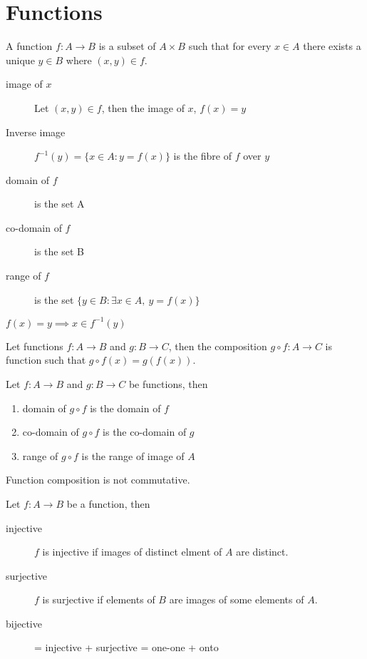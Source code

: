 \section{Functions}
	\begin{definition}
		A function $ f : A \to B$ is a subset of $A \times B$ such that for every $x \in A$ there exists a unique $y \in B$ where $(x,y) \in f$.
	\end{definition}
	\begin{description}
		\item[image of $x$] Let $(x,y) \in f$, then the image of $x$, $ f(x) = y$
		\item[Inverse image] $f^{-1}(y) = \{ x \in A : y = f(x) \}$ is the fibre of $f$ over $y$\cite{gallian}
		\item[domain of $f$] is the set A 
		\item[co-domain of $f$] is the set B
		\item[range of $f$] is the set $\{ y\in B : \exists x \in A,\ y = f(x) \}$
	\end{description}
	\begin{remark}
		$f(x) = y \implies x \in f^{-1}(y)$
	\end{remark}
	\begin{definition}
		Let functions $f : A \to B$ and $g : B \to C$, then the composition $g \circ f : A \to C$ is function such that $g \circ f (x) = g(f(x))$.
	\end{definition}
	\begin{theorem} Let $f : A \to B$ and $g : B \to C$ be functions, then
		\begin{enumerate}
			\item domain of $g \circ f$ is the domain of $f$
			\item co-domain of $g \circ f$ is the co-domain of $g$
			\item range of $g \circ f$ is the range of image of $A$ 
		\end{enumerate}
	\end{theorem}
	\begin{remark}
		Function composition is not commutative.
	\end{remark}
	\begin{definition} Let $f : A \to B$ be a function, then 
		\begin{description}
			\item[injective] $f$ is injective if images of distinct elment of $A$ are distinct.
			\item[surjective] $f$ is surjective if elements of $B$ are images of some elements of $A$.
			\item[bijective] = injective + surjective = one-one + onto
		\end{description}
	\end{definition}
